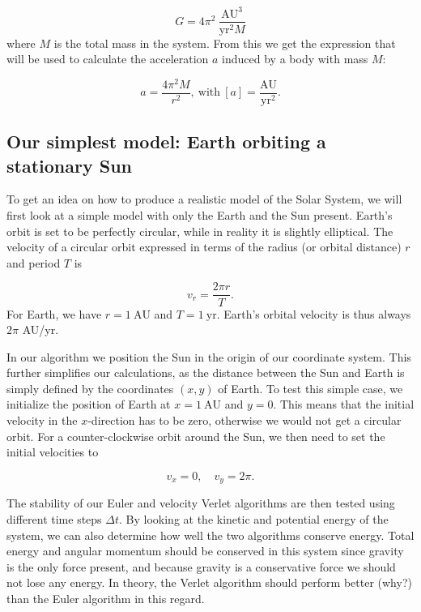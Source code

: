 \documentclass{emulateapj}
\begin{document}
\begin{equation}
G = 4\pi^2 \ \frac{\textrm{AU}^3}{\textrm{yr}^{2}M} 
\end{equation}
where $M$ is the total mass in the system. From this we get the expression that will be used to calculate the acceleration $a$ induced by a body with mass $M$:

\begin{equation}
a = \frac{4\pi^2 M}{r^2}, \ \textrm{with} \ [a] = \frac{\textrm{AU}}{\textrm{yr}^2}.
\end{equation}


\subsection{Our simplest model: Earth orbiting a stationary Sun}

To get an idea on how to produce a realistic model of the Solar System, we will first look at a simple model with only the Earth and the Sun present. Earth's orbit is set to be perfectly circular, while in reality it is slightly elliptical. The velocity of a circular orbit expressed in terms of the radius (or orbital distance) $r$ and period $T$ is

\begin{equation}
    v_r = \frac{2\pi r}{T}.
\end{equation}
For Earth, we have $r = 1 \ \textrm{AU}$ and $T = 1 \ \textrm{yr}$. Earth's orbital velocity is thus always $2\pi$ AU/yr.

In our algorithm we position the Sun in the origin of our coordinate system. This further simplifies our calculations, as the distance between the Sun and Earth is simply defined by the coordinates $(x, y)$ of Earth. To test this simple case, we initialize the position of Earth at $x = 1 \ \textrm{AU}$ and $y = 0$. This means that the initial velocity in the $x$-direction has to be zero, otherwise we would not get a circular orbit. For a counter-clockwise orbit around the Sun, we then need to set the initial velocities to

\begin{equation}
    v_x = 0, \quad v_y = 2\pi.
\end{equation}

The stability of our Euler and velocity Verlet algorithms are then tested using different time steps $\Delta t$. By looking at the kinetic and potential energy of the system, we can also determine how well the two algorithms conserve energy. Total energy and angular momentum should be conserved in this system since gravity is the only force present, and because gravity is a conservative force we should not lose any energy. In theory, the Verlet algorithm should perform better (why?) than the Euler algorithm in this regard.
\end{document}
